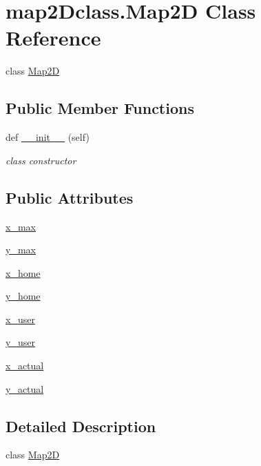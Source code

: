 \hypertarget{classmap2Dclass_1_1Map2D}{}\section{map2\+Dclass.\+Map2D Class Reference}
\label{classmap2Dclass_1_1Map2D}


class \hyperlink{classmap2Dclass_1_1Map2D}{Map2D}  


\subsection*{Public Member Functions}
\begin{DoxyCompactItemize}
\item 
def \hyperlink{classmap2Dclass_1_1Map2D_a55b653906e6239a8f169bae83e04d958}{\+\_\+\+\_\+init\+\_\+\+\_\+} (self)
\begin{DoxyCompactList}\small\item\em class constructor \end{DoxyCompactList}\end{DoxyCompactItemize}
\subsection*{Public Attributes}
\begin{DoxyCompactItemize}
\item 
\hyperlink{classmap2Dclass_1_1Map2D_a8c20f1690dbc86e739df1421874770dc}{x\+\_\+max}
\item 
\hyperlink{classmap2Dclass_1_1Map2D_a0649fe2c5babb7f8c75a616db98c90b5}{y\+\_\+max}
\item 
\hyperlink{classmap2Dclass_1_1Map2D_a527101caed136507eaa26746a9d7b3e3}{x\+\_\+home}
\item 
\hyperlink{classmap2Dclass_1_1Map2D_a508196fe9a02de84eb945bb6a7a583fa}{y\+\_\+home}
\item 
\hyperlink{classmap2Dclass_1_1Map2D_a4611fa766b3ba89584ab75040b93f5b2}{x\+\_\+user}
\item 
\hyperlink{classmap2Dclass_1_1Map2D_ab7979918e584a7d6ef5f45bbaf5a22af}{y\+\_\+user}
\item 
\hyperlink{classmap2Dclass_1_1Map2D_a04fabacddf43967b9277cdfecdfb8a19}{x\+\_\+actual}
\item 
\hyperlink{classmap2Dclass_1_1Map2D_aa61f9159d4f2bd919ecd31870e0c04b8}{y\+\_\+actual}
\end{DoxyCompactItemize}


\subsection{Detailed Description}
class \hyperlink{classmap2Dclass_1_1Map2D}{Map2D} 

